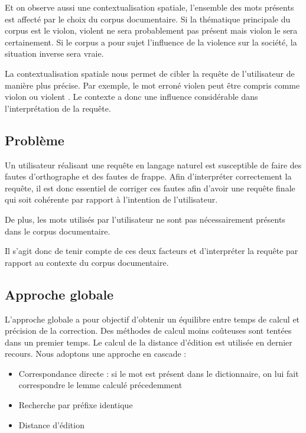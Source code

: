\documentclass[a4paper]{elsarticle}
\begin{document}
Et on observe aussi une contextualisation spatiale, l'ensemble des mots présents est affecté par le choix du corpus documentaire. Si la thématique principale du corpus est le violon, \og violent \fg{} ne sera probablement pas présent mais \og violon \fg{} le sera certainement. Si le corpus a pour sujet l'influence de la violence sur la société, la situation inverse sera vraie.

La contextualisation spatiale nous permet de cibler la requête de l'utilisateur de manière plus précise. Par exemple, le mot erroné \og violen \fg{} peut être compris comme \og violon \fg{} ou \og violent \fg{}. Le contexte a donc une influence considérable dans l'interprétation de la requête.

\subsection{Problème}

Un utilisateur réalisant une requête en langage naturel est susceptible de faire des fautes d'orthographe et des fautes de frappe. Afin d'interpréter correctement la requête, il est donc essentiel de corriger ces fautes afin d'avoir une requête finale qui soit cohérente par rapport à l'intention de l'utilisateur.

De plus, les mots utilisés par l'utilisateur ne sont pas nécessairement présents dans le corpus documentaire.

Il s'agit donc de tenir compte de ces deux facteurs et d'interpréter la requête par rapport au contexte du corpus documentaire.

\subsection{Approche globale}

L'approche globale a pour objectif d'obtenir un équilibre entre temps de calcul et précision de la correction. Des méthodes de calcul moins coûteuses sont tentées dans un premier temps. Le calcul de la distance d'édition est utilisée en dernier recours. Nous adoptons une approche en cascade :

\begin{itemize}
\item Correspondance directe : si le mot est présent dans le dictionnaire, on lui fait correspondre le lemme calculé précedemment
\item Recherche par préfixe identique \cite{morizetmahoudeaux2016lo17}
\item Distance d'édition
\end{itemize}
\end{document}
